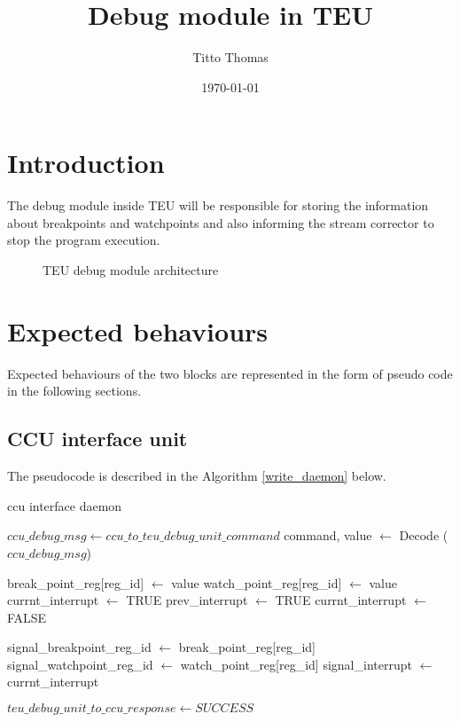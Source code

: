 \documentclass[a4paper, 11pt]{article}
\title{Debug module in TEU}
\author{Titto Thomas}
\date{\today}
\begin{document}
\maketitle

\section{Introduction}
The debug module inside TEU will be responsible for storing the information about breakpoints and watchpoints and also informing the stream corrector to stop the program execution.

\vspace*{1cm}
\begin{figure}[h!]
	\centering
	\def\svgwidth{\textwidth}
	
	\hspace*{-0.75cm}
	\caption{TEU debug module architecture}
	\label{BlockFig}
\end{figure}

\section{Expected behaviours}

Expected behaviours of the two blocks are represented in the form of pseudo code in the following sections.

\subsection{CCU interface unit}
The pseudocode is described in the Algorithm \ref{write_daemon} below.
\begin{algorithm}
\caption{ccu interface daemon}\label{write_daemon}
\begin{algorithmic}[1]
	\State $ccu\_debug\_msg\gets ccu\_to\_teu\_debug\_unit\_command$
	\State command, value $\gets$ Decode ($ccu\_debug\_msg$)
	
		\State break\_point\_reg[reg\_id] $\gets $ value
		\State watch\_point\_reg[reg\_id] $\gets $ value
		\State currnt\_interrupt $\gets $ TRUE
		\State prev\_interrupt $\gets$ TRUE
	\Else
		\State currnt\_interrupt $\gets $ FALSE
	\EndIf
	
	\State signal\_breakpoint\_reg\_id $\gets$  break\_point\_reg[reg\_id]
	\EndFor
	\State signal\_watchpoint\_reg\_id $\gets$  watch\_point\_reg[reg\_id]
	\EndFor
	\State signal\_interrupt $\gets$  currnt\_interrupt
	
		\State $teu\_debug\_unit\_to\_ccu\_response \gets SUCCESS$
	\EndIf
	\EndWhile	
	\EndFunction
\end{algorithmic}
\end{algorithm}
\end{document}
